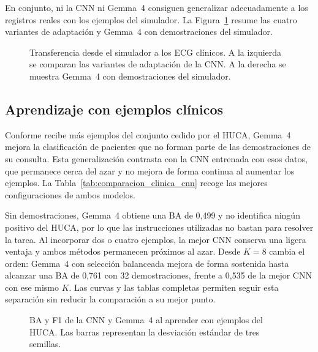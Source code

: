 En conjunto, ni la CNN ni Gemma~4 consiguen generalizar adecuadamente a los registros reales con los ejemplos del simulador. La Figura~\ref{fig:transfer_summary} resume las cuatro variantes de adaptación y Gemma~4 con demostraciones del simulador.

\begin{figure}[H]
  \centering
  \caption{Transferencia desde el simulador a los ECG clínicos. A la izquierda se comparan las variantes de adaptación de la CNN. A la derecha se muestra Gemma~4 con demostraciones del simulador.}
  \label{fig:transfer_summary}
\end{figure}

\subsection{Aprendizaje con ejemplos clínicos}
\label{sec:resultados_clinicos}

Conforme recibe más ejemplos del conjunto cedido por el HUCA, Gemma~4 mejora la clasificación de pacientes que no forman parte de las demostraciones de su consulta. Esta generalización contrasta con la CNN entrenada con esos datos, que permanece cerca del azar y no mejora de forma continua al aumentar los ejemplos. La Tabla~\ref{tab:comparacion_clinica_cnn} recoge las mejores configuraciones de ambos modelos.


Sin demostraciones, Gemma~4 obtiene una BA de 0,499 y no identifica ningún positivo del HUCA, por lo que las instrucciones utilizadas no bastan para resolver la tarea. Al incorporar dos o cuatro ejemplos, la mejor CNN conserva una ligera ventaja y ambos métodos permanecen próximos al azar. Desde \(K=8\) cambia el orden: Gemma~4 con selección balanceada mejora de forma sostenida hasta alcanzar una BA de 0,761 con 32 demostraciones, frente a 0,535 de la mejor CNN con ese mismo \(K\). Las curvas y las tablas completas permiten seguir esta separación sin reducir la comparación a su mejor punto.

\begin{figure}[H]
  \centering
  \caption{BA y F1 de la CNN y Gemma~4 al aprender con ejemplos del HUCA. Las barras representan la desviación estándar de tres semillas.}
  \label{fig:clinical_cnn_gemma_performance}
\end{figure}

